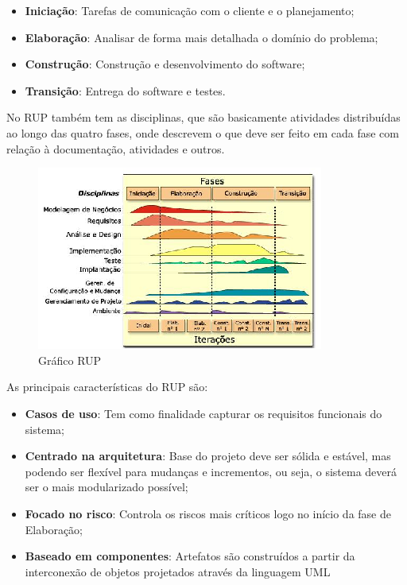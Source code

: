  \begin{itemize}
    \item \textbf{Iniciação}: Tarefas de comunicação com o cliente e o planejamento;
    \item \textbf{Elaboração}: Analisar de forma mais detalhada o domínio do problema;
    \item \textbf{Construção}: Construção e desenvolvimento do software;
    \item \textbf{Transição}: Entrega do software e testes.
  \end{itemize}

  No RUP também tem as disciplinas, que são basicamente atividades distribuídas ao longo das quatro fases, onde descrevem o que deve ser
  feito em cada fase com relação à documentação, atividades e outros.

  \begin{figure}[!htpb]
    \centering
    \includegraphics[scale=2.0]{figuras/abordagem/Fases_RUP}
    \caption{Gráfico RUP}
  \end{figure}

  As principais características do RUP são:

  \begin{itemize}
    \item \textbf{Casos de uso}: Tem como finalidade capturar os requisitos funcionais do sistema;
    \item \textbf{Centrado na arquitetura}: Base do projeto deve ser sólida e estável, mas podendo ser flexível para mudanças e incrementos, ou seja, o sistema deverá ser o mais modularizado possível;
    \item \textbf{Focado no risco}: Controla os riscos mais críticos logo no início da fase de Elaboração;
    \item \textbf{Baseado em componentes}: Artefatos são construídos a partir da interconexão de objetos projetados através da linguagem UML
  \end{itemize}

